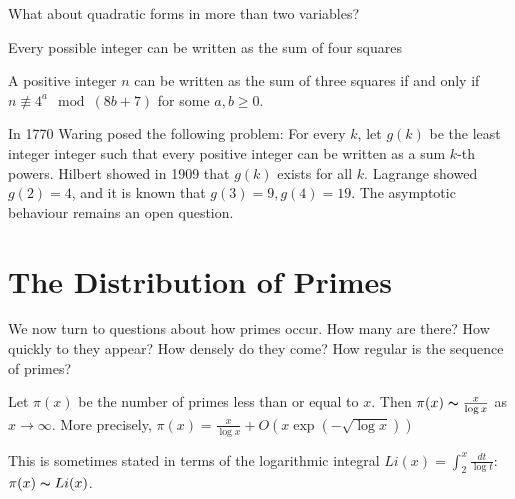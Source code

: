 \documentclass[10pt,a4paper]{article}
\begin{document}
What about quadratic forms in more than two variables?
\begin{theorem}[Lagrange, 1770]
Every possible integer can be written as the sum of four squares
\end{theorem}
\begin{theorem}[Legendre, 1797]
A positive integer $n$ can be written as the sum of three squares if and only if $n \nequiv 4^a \mod (8b+7)$ for some $a,b \geq 0$.
\end{theorem}

In 1770 Waring posed the following problem: For every $k$, let $g(k)$ be the least integer integer such that every positive integer can be written as a sum $k$-th powers. Hilbert showed in 1909 that $g(k)$ exists for all $k$. Lagrange showed $g(2) = 4$, and it is known that $g(3) = 9, g(4) = 19$. The asymptotic behaviour remains an open question.

\section{The Distribution of Primes}
We now turn to questions about how primes occur. How many are there? How quickly to they appear? How densely do they come? How regular is the sequence of primes?

\begin{theorem}
Let $\pi(x)$ be the number of primes less than or equal to $x$. Then $\pi(x) \thicksim \frac{x}{\log x}$ as $x \to \infty$. More precisely, $\pi(x) = \frac{x}{\log x} + O(x \exp(-\sqrt{\log x}))$
\end{theorem}
This is sometimes stated in terms of the logarithmic integral $Li(x) = \int_2^x \frac{dt}{\log t}$:  $\pi(x) \thicksim Li(x)$.
\end{document}
